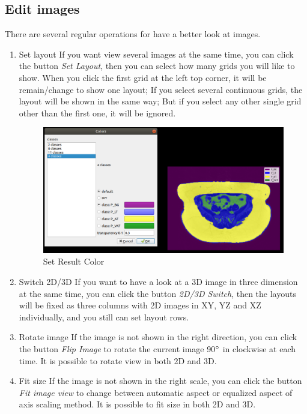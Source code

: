 \documentclass[12pt]{article}
\begin{document}
\subsection{Edit images}
There are several regular operations for have a better look at images.
\begin{enumerate}
	\item Set layout
	\newline If you want view several images at the same time, you can click the button \textit{Set Layout}, then you can select how many grids you will like to show. When you click the first grid at the left top corner, it will be remain/change to show one layout; If you select several continuous grids, the layout will be shown in the same way; But if you select any other single grid other than the first one, it will be ignored. 
	\begin{figure}[htbp]	
		\centering
		\includegraphics[width=\textwidth]{set_result_color.png}
		\caption[Set Result Color]{Set Result Color}
		\label{fig:set_result_color}
	\end{figure}
	\item Switch 2D/3D
	\newline If you want to have a look at a 3D image in three dimension at the same time, you can click the button \textit{2D/3D Switch}, then the layouts will be fixed as three columns with 2D images in XY, YZ and XZ individually, and you still can set layout rows.
	\item Rotate image
	\newline If the image is not shown in the right direction, you can click the button \textit{Flip Image} to rotate the current image 90$\degree$ in clockwise at each time. It is possible to rotate view in both 2D and 3D.
	\item Fit size
	\newline If the image is not shown in the right scale, you can click the button \textit{Fit image view} to change between automatic aspect or equalized aspect of axis scaling method. It is possible to fit size in both 2D and 3D.

\end{enumerate}
\end{document}

